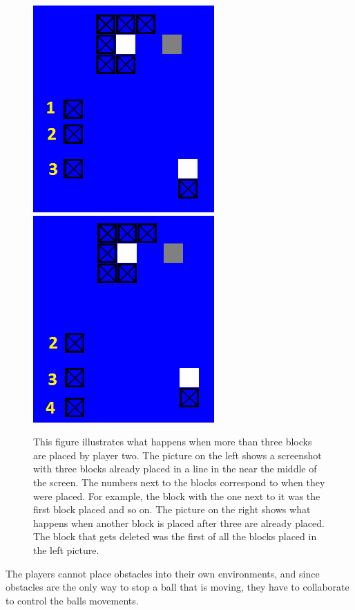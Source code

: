 \begin{figure}
\hspace*{\fill}\includegraphics[width=0.45\columnwidth]{blocksplaced1-cropped.png}
\hspace*{\fill}\includegraphics[width=0.45\columnwidth]{blocksplaced2-cropped.png}\hspace*{\fill}
\caption{
This figure illustrates what happens when more than three
blocks are placed by player two. The picture on the left shows a
screenshot with three blocks already placed in a line in the near the
middle of the screen. The numbers next to the blocks correspond to
when they were placed. For example, the block with the one next to it
was the first block placed and so on. The picture on the right shows
what happens when another block is placed after three are already
placed. The block that gets deleted was the first of all the blocks
placed in the left picture.}\label{fig:dropping-blocks}
\end{figure}

The players cannot place obstacles into their own environments, and
since obstacles are the only way to stop a ball that is moving, they
have to collaborate to control the balls movements. 


